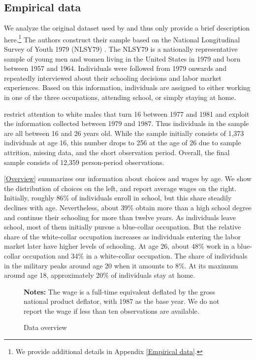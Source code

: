 \subsection{Empirical data}
We analyze the original dataset used by \citet{Keane.1997} and thus only provide a brief description here.\footnote{We provide additional details in Appendix \ref{Empirical data}.} The authors construct their sample based on the National Longitudinal Survey of Youth 1979 (NLSY79) \citep{NLSY.2019}. The NLSY79 is a nationally representative sample of young men and women living in the United States in 1979 and born between 1957 and 1964. Individuals were followed from 1979 onwards and repeatedly interviewed about their schooling decisions and labor market experiences. Based on this information, individuals are assigned to either working in one of the three occupations, attending school, or simply staying at home.

\citet{Keane.1997} restrict attention to white males that turn 16 between 1977 and 1981 and exploit the information collected between 1979 and 1987. Thus individuals in the sample are all between 16 and 26 years old. While the sample initially consists of 1,373 individuals at age 16, this number drops to 256 at the age of 26 due to sample attrition, missing data, and the short observation period. Overall, the final sample consists of 12,359 person-period observations.

\autoref{Overview} summarizes our information about choices and wages by age. We show the distribution of choices on the left, and report average wages on the right. Initially, roughly 86\% of individuals enroll in school, but this share steadily declines with age. Nevertheless, about 39\% obtain more than a high school degree and continue their schooling for more than twelve years. As individuals leave school, most of them initially pursue a blue-collar occupation. But the relative share of the white-collar occupation increases as individuals entering the labor market later have higher levels of schooling. At age 26, about 48\% work in a blue-collar occupation and 34\% in a white-collar occupation. The share of individuals in the military peaks around age 20 when it amounts to 8\%. At its maximum around age 18, approximately 20\% of individuals stay at home.

%
\begin{figure}[t!]\centering
\caption{Data overview}\label{Overview}
\hspace{0.3cm}
\begin{center}
\begin{minipage}[t]{0.8\columnwidth}
\item \scriptsize{\textbf{Notes:} The wage is a full-time equivalent deflated by the gross national product deflator, with 1987 as the base year. We do not report the wage if less than ten observations are available.}
\end{minipage}
\end{center}
\end{figure}%
%

